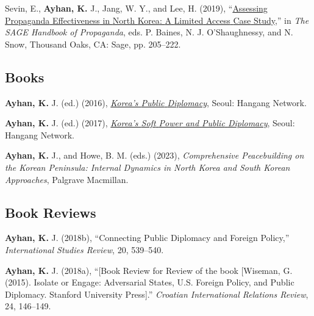 \documentclass[11pt,a4paper,]{awesome-cv}
\begin{document}
\leavevmode{}%
Sevin, E., \textbf{Ayhan, K.} J., Jang, W. Y., and Lee, H. (2019),
{``\href{https://dx.doi.org/10.4135/9781526477170}{Assessing
{Propaganda} {Effectiveness} in {North} {Korea}: {A} {Limited} {Access}
{Case} {Study}},''} in \emph{The {SAGE} {Handbook} of {Propaganda}},
eds. P. Baines, N. J. O'Shaughnessy, and N. Snow, Thousand Oaks, CA:
Sage, pp. 205--222.

\hypertarget{books}{%
\subsection{Books}\label{books}}

\hypertarget{refs_books}{}
\leavevmode{}%
\textbf{Ayhan, K.} J. (ed.) (2016),
\emph{\href{https://www.researchgate.net/publication/318492917_Korea\textquotesingle{}s_Public_Diplomacy}{Korea's
{Public} {Diplomacy}}}, Seoul: Hangang Network.

\leavevmode{}%
\textbf{Ayhan, K.} J. (ed.) (2017),
\emph{\href{https://www.researchgate.net/publication/321874044_Korea\textquotesingle{}s_Soft_Power_and_Public_Diplomacy}{Korea's
{Soft} {Power} and {Public} {Diplomacy}}}, Seoul: Hangang Network.

\leavevmode{}%
\textbf{Ayhan, K.} J., and Howe, B. M. (eds.) (2023),
\emph{Comprehensive {Peacebuilding} on the {Korean} {Peninsula}:
{Internal} {Dynamics} in {North} {Korea} and {South} {Korean}
{Approaches}}, Palgrave Macmillan.

\hypertarget{book-reviews}{%
\subsection{Book Reviews}\label{book-reviews}}

\hypertarget{refs_reviews}{}
\leavevmode{}%
\textbf{Ayhan, K.} J. (2018b), {``Connecting {Public} {Diplomacy} and
{Foreign} {Policy},''} \emph{International Studies Review}, 20,
539--540.

\leavevmode{}%
\textbf{Ayhan, K.} J. (2018a), {``{[}{Book} {Review} for {Review} of the
book {[}{Wiseman}, {G}. (2015). {Isolate} or {Engage}: {Adversarial}
{States}, {U}.{S}. {Foreign} {Policy}, and {Public} {Diplomacy}.
{Stanford} {University} {Press}{]}.''} \emph{Croatian International
Relations Review}, 24, 146--149.
\end{document}
